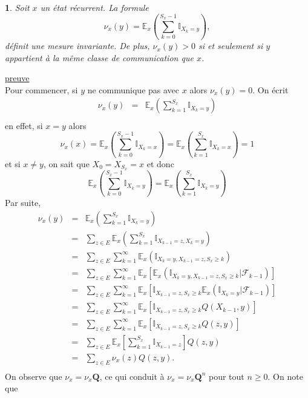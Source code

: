 \documentclass[8pt,notheorems]{beamer}
\def \E{\mathbb E}
\newtheorem{theorem}{\translate{Theorem}}[section]
\newtheorem{theorem}{\translate{Theoreme}}
\theoremstyle{definition}
\theoremstyle{example}
\theoremstyle{mystyle}
\theoremstyle{plain}
\begin{document}
\begin{frame}[allowframebreaks]
\begin{theorem}
Soit $x$ un état récurrent. La formule
$$
\nu_x(y) = \E_x\left(\sum_{k = 0}^{S_x -1}\mathbb{I}_{X_k = y}\right),
$$
définit une mesure invariante. De plus, $\nu_x(y)>0$ si et seulement si $y$ appartient à la même classe de communication que $x$.
\end{theorem}
\underline{preuve}\\
Pour commencer, si $y$ ne communique pas avec $x$ alors $\nu_x(y) = 0$. On écrit
\begin{eqnarray*}
\nu_x(y) &=& \E_x\left(\sum_{k = 1}^{S_x}\mathbb{I}_{X_k=y}\right)\\
\end{eqnarray*}
en effet, si $x=y$ alors
$$
\nu_x(x) =\E_x\left(\sum_{k = 0}^{S_x-1}\mathbb{I}_{X_k=x}\right)= \E_x\left(\sum_{k = 1}^{S_x}\mathbb{I}_{X_k=x}\right)=1
$$
et si $x\neq y$, on sait que $X_0 = X_{S_x} = x$ et donc
$$
\E_x\left(\sum_{k = 0}^{S_x-1}\mathbb{I}_{X_k=y}\right)= \E_x\left(\sum_{k = 1}^{S_x}\mathbb{I}_{X_k=y}\right)
$$
Par suite,
\begin{eqnarray*}
\nu_x(y) &=& \E_x\left(\sum_{k = 1}^{S_x}\mathbb{I}_{X_k=y}\right)\\
 &=& \sum_{z \in E} \E_x\left(\sum_{k = 1}^{S_x}\mathbb{I}_{X_{k-1} = z, X_k=y}\right)\\
&=& \sum_{z \in E} \sum_{k = 1}^{\infty}\E_x\left(\mathbb{I}_{X_k=y, X_{k-1} = z, S_x\geq k}\right)\\
&=& \sum_{z \in E} \sum_{k = 1}^{\infty}\E_x\left[\E_x \left(\mathbb{I}_{X_k=y, X_{k-1} = z, S_x\geq k}\big\rvert \mathcal{F}_{k-1} \right)\right]\\
&=& \sum_{z \in E} \sum_{k = 1}^{\infty}\E_x\left[\mathbb{I}_{X_{k-1} = z, S_x\geq k}
\E_x\left(\mathbb{I}_{X_k=y}\big\rvert \mathcal{F}_{k-1} \right)\right]\\
&=& \sum_{z \in E} \sum_{k = 1}^{\infty}\E_x\left[\mathbb{I}_{X_{k-1} = z, S_x\geq k}Q(X_{k-1},y)\right]\\
&=& \sum_{z \in E} \sum_{k = 1}^{\infty}\E_x\left[\mathbb{I}_{X_{k-1} = z, S_x\geq k}Q(z,y)\right]\\
&=& \sum_{z \in E} \E_x\left[\sum_{k = 1}^{S_x}\mathbb{I}_{X_{k-1} = z}\right]Q(z,y)\\
&=& \sum_{z \in E} \nu_x(z)Q(z,y).\\
\end{eqnarray*}
On observe que $\nu_x = \nu_x\mathbf{Q}$, ce qui conduit à $\nu_x = \nu_x\mathbf{Q}^n$ pour tout $n \geq 0$. On note que

\end{frame}
\end{document}

